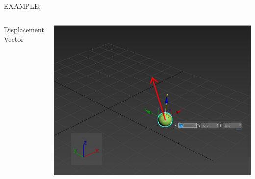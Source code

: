 \documentclass[]{beamer}
\begin{document}
  \begin{frame}
  
  
  EXAMPLE:
  
  
  
  
  
  
  
  \begin{columns}
  
  Displacement Vector
  
  
  
  \begin{center}
       \includegraphics[width=1.1\textwidth]{images/exampleVS3.jpg}      
       \end{center}
  
  
  \end{columns}
  
  
  
  
   \end{frame}
  
  
\end{document}
